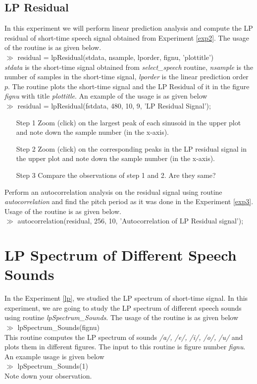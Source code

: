 \subsection{LP Residual}
\label{lpres}
In this experiment we will perform linear
prediction analysis and compute the LP residual of short-time speech signal
obtained from Experiment \ref{exp2}. The usage of the
routine is as given below.\\[2ex]
$\gg$ residual = lpResidual(stdata, nsample, lporder, fignu,
'plottitle')\\[1ex]
\noindent
{\it stdata} is the short-time signal obtained from {\it
select\_speech} routine, {\it nsample} is the number of samples in the
short-time signal, {\it lporder} is the linear prediction order
$p$. The routine plots the short-time signal and the LP Residual of it
in the figure {\it fignu} with title {\it plottitle}. An example of
the usage is as given below\\[2ex]
$\gg$ residual = lpResidual(fstdata, 480, 10, 9, 'LP Residual
Signal');
\begin{itemize}
	\item [Step 1] Zoom (click) on the largest peak of each
sinusoid in the upper plot and note down the sample number (in the
x-axis). 
	\item [Step 2] Zoom (click) on the corresponding peaks in the
LP residual signal in the upper plot and note down the sample number
(in the x-axis).
	\item [Step 3] Compare the observations of step 1 and 2. Are
they same?
\end{itemize}
Perform an autocorrelation analysis on the residual signal using
routine {\it autocorrelation} and find the pitch period as it was done
in the Experiment \ref{exp3}. Usage of the routine is as
given below.\\[2ex]
$\gg$ autocorrelation(residual, 256, 10, 'Autocorrelation of LP
Residual signal');

\section{LP Spectrum of Different Speech Sounds}
\label{exp7}
In the Experiment \ref{lp}, we studied the LP spectrum of short-time
signal. In this experiment, we are going to study the LP spectrum of
different speech sounds using routine {\it lpSpectrum\_Sounds}. The
usage of the routine is as given below\\[2ex]
$\gg$ lpSpectrum\_Sounds(fignu)\\[2ex]
\noindent
This routine computes the LP spectrum of sounds {\it /a/, /e/, /i/,
/o/, /u/} and plots them in different figures. The input to this
routine is figure number {\it fignu}. An example usage is given below\\[2ex]
$\gg$ lpSpectrum\_Sounds(1)\\[2ex]
\noindent 
Note down your observation.


